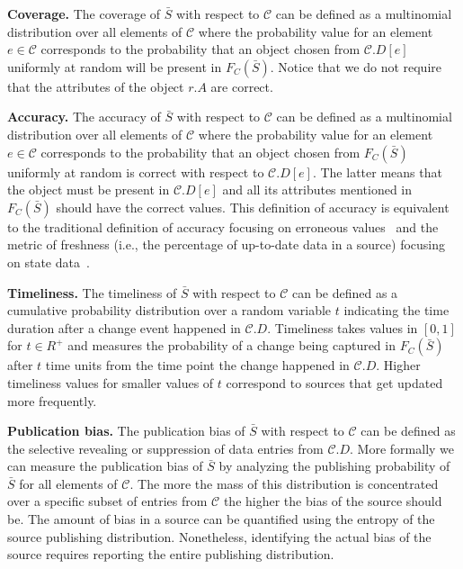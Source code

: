 \documentclass{sig-alternate}
\begin{document}
\vspace{3pt}\noindent\textbf{Coverage.} The coverage of $\bar{S}$ with respect to $\mathcal{C}$ can be defined as a multinomial distribution over all elements of $\mathcal{C}$ where the probability value for an element $e \in \mathcal{C}$ corresponds to the probability that an object chosen from $\mathcal{C}.D[e]$ uniformly at random will be present in $F_C(\bar{S})$. Notice that we do not require that the attributes of the object $r.A$ are correct.

\vspace{3pt}\noindent\textbf{Accuracy.} The accuracy of $\bar{S}$ with respect to $\mathcal{C}$ can be defined as a multinomial distribution over all elements of  $\mathcal{C}$ where the probability value for an element $e \in \mathcal{C}$ corresponds to the probability that an object chosen from $F_C(\bar{S})$ uniformly at random is correct with respect to $\mathcal{C}.D[e]$. The latter means that the object must be present in $\mathcal{C}.D[e]$ and all its attributes mentioned in $F_C(\bar{S})$ should have the correct values. This definition of accuracy is equivalent to the traditional definition of accuracy focusing on erroneous values~\cite{dong:vldb13} and the metric of freshness (i.e., the percentage of up-to-date data in a source) focusing on state data~\cite{rekatsinas:2014}.

\vspace{3pt}\noindent\textbf{Timeliness.} The timeliness of $\bar{S}$ with respect to $\mathcal{C}$ can be defined as a cumulative probability distribution over a random variable $t$ indicating the time duration after a change event happened in $\mathcal{C}.D$. Timeliness takes values in $[0,1]$ for $t \in R^+$ and measures the probability of a change being captured in $F_C(\bar{S})$ after $t$ time units from the time point the change happened in $\mathcal{C}.D$. Higher timeliness values for smaller values of $t$ correspond to sources that get updated more frequently.

\vspace{3pt}\noindent\textbf{Publication bias.} The publication bias of $\bar{S}$ with respect to $\mathcal{C}$ can be defined as the selective revealing or suppression of data entries from $\mathcal{C}.D$. More formally we can measure the publication bias of $\bar{S}$ by analyzing the publishing probability of $\bar{S}$ for all elements of $\mathcal{C}$. The more the mass of this distribution is concentrated over a specific subset of entries from $\mathcal{C}$ the higher the bias of the source should be. The amount of bias in a source can be quantified using the entropy of the source publishing distribution. Nonetheless, identifying the actual bias of the source requires reporting the entire publishing distribution.
\end{document}
